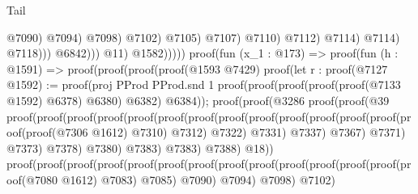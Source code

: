 \begin{lexlean}{Tail}
\begin{coremodule}
                                                          @7090)
                                                        @7094)
                                                      @7098)
                                                    @7102)
                                                  @7105)
                                                @7107)
                                              @7110)
                                            @7112)
                                          @7114)
                                        @7114)
                                      @7118)))
                            @6842)))
                    @11)
                  @1582)))))
      proof(fun (x_1 : @173) =>
        proof(fun (h : @1591) =>
          proof(proof(proof(proof(@1593 @7429)
                  proof(let r : proof(@7127
                        @1592) := proof(proj PProd PProd.snd 1
                      proof(proof(proof(proof(proof(@7133 @1592) @6378) @6380) @6382) @6384));
                    proof(proof(@3286
                          proof(proof(@39
                                proof(proof(proof(proof(proof(proof(proof(proof(proof(proof(proof(proof(proof(proof(proof(@7306
                                                                @1612)
                                                              @7310)
                                                            @7312)
                                                          @7322)
                                                        @7331)
                                                      @7337)
                                                    @7367)
                                                  @7371)
                                                @7373)
                                              @7378)
                                            @7380)
                                          @7383)
                                        @7383)
                                      @7388)
                                    @18))
                              proof(proof(proof(proof(proof(proof(proof(proof(proof(proof(proof(proof(proof(proof(@7080
                                                            @1612)
                                                          @7083)
                                                        @7085)
                                                      @7090)
                                                    @7094)
                                                  @7098)
                                                @7102)

\end{coremodule}
\end{lexlean}

